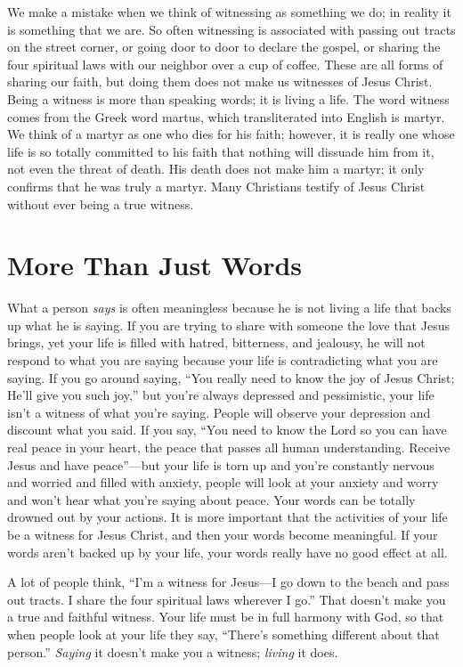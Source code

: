 We make a mistake when we think of witnessing as
something we do; in reality it is something that we are. So
often witnessing is associated with passing out tracts on the
street corner, or going door to door to declare the gospel,
or sharing the four spiritual laws with our neighbor over
a cup of coffee. These are all forms of sharing our faith,
but doing them does not make us witnesses of Jesus Christ.
Being a witness is more than speaking words; it is living a
life. The word witness comes from the Greek word martus,
which transliterated into English is martyr. We think of a
martyr as one who dies for his faith; however, it is really one
whose life is so totally committed to his faith that nothing
will dissuade him from it, not even the threat of death. His
death does not make him a martyr; it only confirms that he
was truly a martyr. Many Christians testify of Jesus Christ
without ever being a true witness.


\section*{More Than Just Words}

What a person \emph{says} is often meaningless because he is
not living a life that backs up what he is saying. If you are
trying to share with someone the love that Jesus brings, yet
your life is filled with hatred, bitterness, and jealousy, he
will not respond to what you are saying because your life is
contradicting what you are saying. If you go around saying,
“You really need to know the joy of Jesus Christ; He’ll give
you such joy,” but you’re always depressed and pessimistic,
your life isn’t a witness of what you’re saying. People will
observe your depression and discount what you said. If you
say, “You need to know the Lord so you can have real peace
in your heart, the peace that passes all human understanding.
Receive Jesus and have peace”—but your life is torn up
and you’re constantly nervous and worried and filled with
anxiety, people will look at your anxiety and worry and
won’t hear what you’re saying about peace. Your words can
be totally drowned out by your actions. It is more important
that the activities of your life be a witness for Jesus Christ,
and then your words become meaningful. If your words
aren’t backed up by your life, your words really have no
good effect at all.

A lot of people think, “I’m a witness for Jesus—I go
down to the beach and pass out tracts. I share the four spiritual
laws wherever I go.” That doesn’t make you a true
and faithful witness. Your life must be in full harmony with
God, so that when people look at your life they say, “There’s
something different about that person.” \emph{Saying} it doesn’t
make you a witness; \emph{living} it does.

